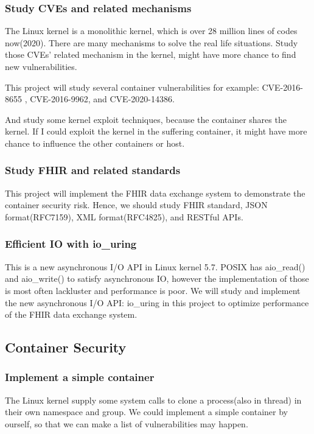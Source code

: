 \documentclass[12pt,a4paper]{IEEEconf}
\begin{document}
\subsubsection{Study CVEs and related mechanisms}
The Linux kernel is a monolithic kernel, which is over 28 million lines of codes now(2020). There
are many mechanisms to solve the real life situations. Study those CVEs' related mechanism in the
kernel, might have more chance to find new vulnerabilities.

This project will study several container vulnerabilities for example: CVE-2016-8655
\cite{CVE-2016-8655}, CVE-2016-9962\cite{CVE-2016-9962}, and CVE-2020-14386\cite{CVE-2020-14386}.

And study some kernel exploit techniques\cite{Kernel_exploitation}, because the container shares
the kernel. If I could exploit the kernel in the suffering container, it might have more chance
to influence the other containers or host.

\subsubsection{Study FHIR and related standards}
This project will implement the FHIR\cite{FHIR_home} data exchange system to demonstrate the container
security risk. Hence, we should study FHIR standard, JSON format(RFC7159), XML format(RFC4825), and
RESTful APIs.

\subsubsection{Efficient IO with io\_uring}\cite{Efficient_IO_uring}
This is a new asynchronous I/O API in Linux kernel 5.7. POSIX has aio\_read() and aio\_write() to
satisfy asynchronous IO, however the implementation of those is most often lackluster and performance
is poor. We will study and implement the new asynchronous I/O API: io\_uring in this project to
optimize performance of the FHIR data exchange system.

\subsection{Container Security}
\subsubsection{Implement a simple container}
The Linux kernel supply some system calls to clone a process(also in thread) in their own namespace
and group. We could implement a simple container by ourself, so that we can make a list of
vulnerabilities may happen.
\begin{CJK*}{UTF8}{bsmi}
  \UseRawInputEncoding
\end{CJK*}
\end{document}
